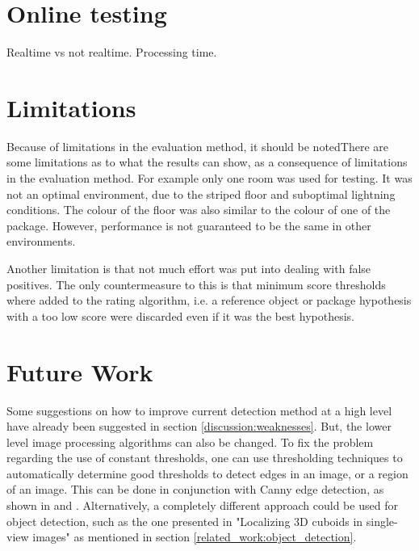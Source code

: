 
\section{Online testing}
Realtime vs not realtime. Processing time. %

\section{Limitations}
Because of limitations in the evaluation method, it should be notedThere are some limitations as to what the results can show, as a consequence of limitations in the evaluation method.
For example only one room was used for testing.
It was not an optimal environment, due to the striped floor and suboptimal lightning conditions.
The colour of the floor was also similar to the colour of one of the package.
However, performance is not guaranteed to be the same in other environments.

Another limitation is that not much effort was put into dealing with false positives.
The only countermeasure to this is that minimum score thresholds where added to the rating algorithm, i.e. a reference object or package hypothesis with a too low score were discarded even if it was the best hypothesis.

\section{Future Work} \label{discussion:future_work}
Some suggestions on how to improve current detection method at a high level have already been suggested in section \ref{discussion:weaknesses}.
But, the lower level image processing algorithms can also be changed.
To fix the problem regarding the use of constant thresholds, one can use thresholding techniques to automatically determine good thresholds to detect edges in an image, or a region of an image.
This can be done in conjunction with Canny edge detection, as shown in \cite{wang2005fast} and \cite{liu2004automated}.
Alternatively, a completely different approach could be used for object detection, such as the one presented in "Localizing 3D cuboids in single-view images" as mentioned in section \ref{related_work:object_detection}.

